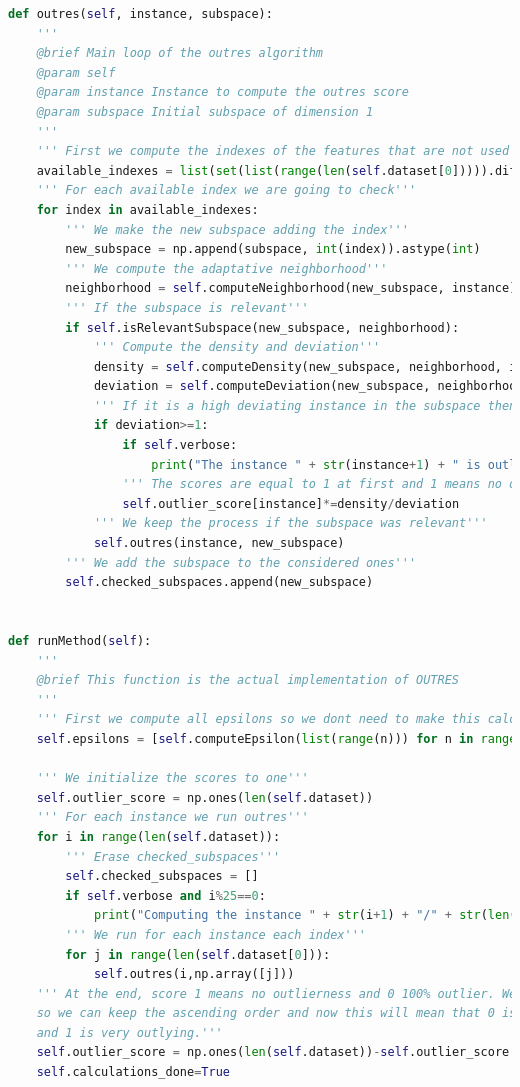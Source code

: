 \begin{lstlisting}[language=Python]
def outres(self, instance, subspace):
	'''
	@brief Main loop of the outres algorithm
	@param self
	@param instance Instance to compute the outres score
	@param subspace Initial subspace of dimension 1
	'''
	''' First we compute the indexes of the features that are not used in the actual subspace'''
	available_indexes = list(set(list(range(len(self.dataset[0])))).difference(set(list(subspace))))
	''' For each available index we are going to check'''
	for index in available_indexes:
		''' We make the new subspace adding the index'''
		new_subspace = np.append(subspace, int(index)).astype(int)
		''' We compute the adaptative neighborhood'''
		neighborhood = self.computeNeighborhood(new_subspace, instance)
		''' If the subspace is relevant'''
		if self.isRelevantSubspace(new_subspace, neighborhood):
			''' Compute the density and deviation'''
			density = self.computeDensity(new_subspace, neighborhood, instance)
			deviation = self.computeDeviation(new_subspace, neighborhood, instance, density)
			''' If it is a high deviating instance in the subspace then we update the score'''
			if deviation>=1:
				if self.verbose:
					print("The instance " + str(instance+1) + " is outlying in the subspace " + str(new_subspace))
				''' The scores are equal to 1 at first and 1 means no outlierness and 0 means very outlying'''
				self.outlier_score[instance]*=density/deviation
			''' We keep the process if the subspace was relevant'''
			self.outres(instance, new_subspace)
		''' We add the subspace to the considered ones'''
		self.checked_subspaces.append(new_subspace)


def runMethod(self):
	'''
	@brief This function is the actual implementation of OUTRES
	'''
	''' First we compute all epsilons so we dont need to make this calculation more than once'''
	self.epsilons = [self.computeEpsilon(list(range(n))) for n in range(len(self.dataset[0])+1)]
	
	''' We initialize the scores to one'''
	self.outlier_score = np.ones(len(self.dataset))
	''' For each instance we run outres'''
	for i in range(len(self.dataset)):
		''' Erase checked_subspaces'''
		self.checked_subspaces = []
		if self.verbose and i%25==0:
			print("Computing the instance " + str(i+1) + "/" + str(len(self.dataset)))
		''' We run for each instance each index'''
		for j in range(len(self.dataset[0])):
			self.outres(i,np.array([j]))
	''' At the end, score 1 means no outlierness and 0 100% outlier. We make 1-score
	so we can keep the ascending order and now this will mean that 0 is no outlierness
	and 1 is very outlying.'''
	self.outlier_score = np.ones(len(self.dataset))-self.outlier_score
	self.calculations_done=True
\end{lstlisting}
